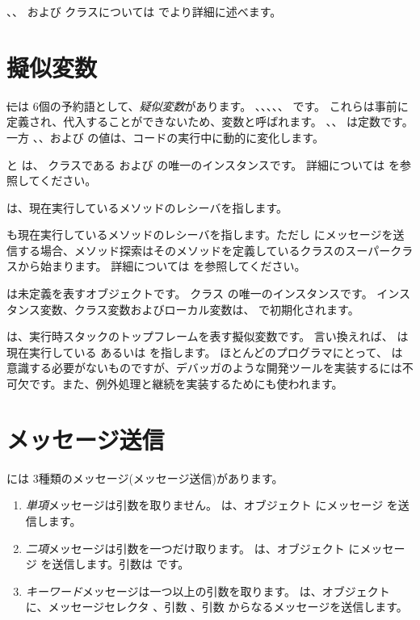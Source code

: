 \documentclass[a4paper,10pt,twoside]{book}
\begin{document}
、、 および  クラスについては  でより詳細に述べます。


\section{擬似変数}

\st には 6個の予約語として、\emph{疑似変数}があります。
、、、、、 です。
これらは事前に定義され、代入することができないため、変数と呼ばれます。
、、 は定数です。一方 、、および  の値は、コードの実行中に動的に変化します。

 と  は、 クラスである  および  の唯一のインスタンスです。
詳細については  を参照してください。

 は、現在実行しているメソッドのレシーバを指します。

 も現在実行しているメソッドのレシーバを指します。ただし \super にメッセージを送信する場合、メソッド探索はそのメソッドを定義しているクラスのスーパークラスから始まります。
詳細については  を参照してください。

 は未定義を表すオブジェクトです。
クラス  の唯一のインスタンスです。
インスタンス変数、クラス変数およびローカル変数は、 で初期化されます。

 は、実行時スタックのトップフレームを表す擬似変数です。
言い換えれば、  は現在実行している  あるいは  を指します。
ほとんどのプログラマにとって、 は意識する必要がないものですが、デバッガのような開発ツールを実装するには不可欠です。また、例外処理と継続を実装するためにも使われます。

\section{メッセージ送信}

\pharo には 3種類のメッセージ(メッセージ送信)があります。
\begin{enumerate}
  \item \emph{単項}メッセージは引数を取りません。
  は、オブジェクト  にメッセージ  を送信します。
  \item \emph{二項}メッセージは引数を一つだけ取ります。
  	 は、オブジェクト  にメッセージ \ct{+} を送信します。引数は  です。
  \item \emph{キーワード}メッセージは一つ以上の引数を取ります。
  	 は、オブジェクト  に、メッセージセレクタ
	、引数 、引数  からなるメッセージを送信します。
\end{enumerate}
\end{document}
